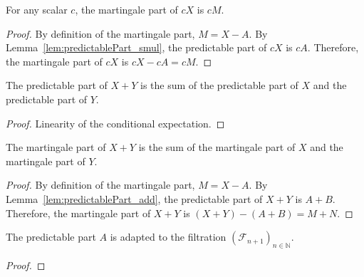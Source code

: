 \begin{lemma}\label{lem:martingalePart_smul}
  \mathlibok
For any scalar $c$, the martingale part of $c X$ is $c M$.
\end{lemma}

\begin{proof}  
By definition of the martingale part, $M = X - A$. By Lemma~\ref{lem:predictablePart_smul}, the predictable part of $c X$ is $c A$. Therefore, the martingale part of $c X$ is $c X - c A = c M$.
\end{proof}


\begin{lemma}\label{lem:predictablePart_add}
  \mathlibok
The predictable part of $X + Y$ is the sum of the predictable part of $X$ and the predictable part of $Y$.
\end{lemma}

\begin{proof}  
Linearity of the conditional expectation.
\end{proof}


\begin{lemma}\label{lem:martingalePart_add}
  \mathlibok
The martingale part of $X + Y$ is the sum of the martingale part of $X$ and the martingale part of $Y$.
\end{lemma}

\begin{proof}  
By definition of the martingale part, $M = X - A$. By Lemma~\ref{lem:predictablePart_add}, the predictable part of $X + Y$ is $A + B$. Therefore, the martingale part of $X + Y$ is $(X + Y) - (A + B) = M + N$.
\end{proof}


\begin{lemma}\label{lem:adapted_predictablePart}
  \mathlibok
The predictable part $A$ is adapted to the filtration $(\mathcal{F}_{n+1})_{n \in \mathbb{N}}$.
\end{lemma}

\begin{proof}\mathlibok

\end{proof}


